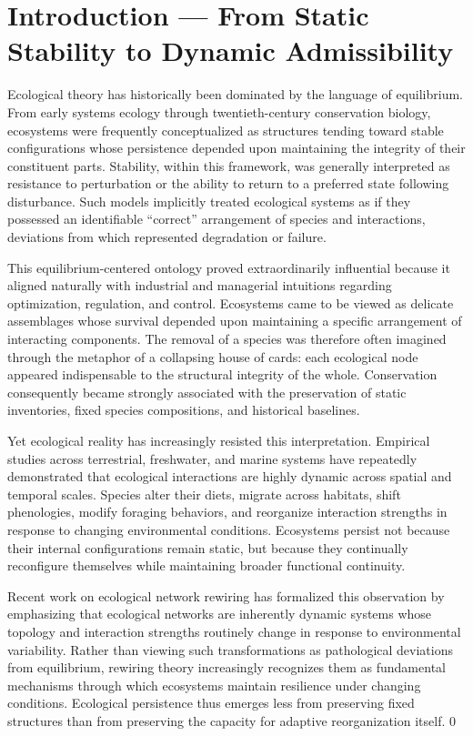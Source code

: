 \documentclass[11pt,a4paper]{article}
\begin{document}
\newpage

\section{Introduction --- From Static Stability to Dynamic Admissibility}

Ecological theory has historically been dominated by the language of equilibrium. From early systems ecology through twentieth-century conservation biology, ecosystems were frequently conceptualized as structures tending toward stable configurations whose persistence depended upon maintaining the integrity of their constituent parts. Stability, within this framework, was generally interpreted as resistance to perturbation or the ability to return to a preferred state following disturbance. Such models implicitly treated ecological systems as if they possessed an identifiable ``correct'' arrangement of species and interactions, deviations from which represented degradation or failure.

This equilibrium-centered ontology proved extraordinarily influential because it aligned naturally with industrial and managerial intuitions regarding optimization, regulation, and control. Ecosystems came to be viewed as delicate assemblages whose survival depended upon maintaining a specific arrangement of interacting components. The removal of a species was therefore often imagined through the metaphor of a collapsing house of cards: each ecological node appeared indispensable to the structural integrity of the whole. Conservation consequently became strongly associated with the preservation of static inventories, fixed species compositions, and historical baselines.

Yet ecological reality has increasingly resisted this interpretation. Empirical studies across terrestrial, freshwater, and marine systems have repeatedly demonstrated that ecological interactions are highly dynamic across spatial and temporal scales. Species alter their diets, migrate across habitats, shift phenologies, modify foraging behaviors, and reorganize interaction strengths in response to changing environmental conditions. Ecosystems persist not because their internal configurations remain static, but because they continually reconfigure themselves while maintaining broader functional continuity.

Recent work on ecological network rewiring has formalized this observation by emphasizing that ecological networks are inherently dynamic systems whose topology and interaction strengths routinely change in response to environmental variability. Rather than viewing such transformations as pathological deviations from equilibrium, rewiring theory increasingly recognizes them as fundamental mechanisms through which ecosystems maintain resilience under changing conditions. Ecological persistence thus emerges less from preserving fixed structures than from preserving the capacity for adaptive reorganization itself. 0
\end{document}
